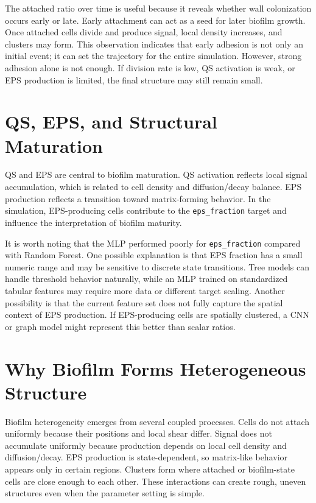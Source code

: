 \documentclass[12pt,a4paper,oneside]{report}
\begin{document}
The attached ratio over time is useful because it reveals whether wall colonization occurs early or late. Early attachment can act as a seed for later biofilm growth. Once attached cells divide and produce signal, local density increases, and clusters may form. This observation indicates that early adhesion is not only an initial event; it can set the trajectory for the entire simulation. However, strong adhesion alone is not enough. If division rate is low, QS activation is weak, or EPS production is limited, the final structure may still remain small.

\section{QS, EPS, and Structural Maturation}
QS and EPS are central to biofilm maturation. QS activation reflects local signal accumulation, which is related to cell density and diffusion/decay balance. EPS production reflects a transition toward matrix-forming behavior. In the simulation, EPS-producing cells contribute to the \texttt{eps\_fraction} target and influence the interpretation of biofilm maturity.

It is worth noting that the MLP performed poorly for \texttt{eps\_fraction} compared with Random Forest. One possible explanation is that EPS fraction has a small numeric range and may be sensitive to discrete state transitions. Tree models can handle threshold behavior naturally, while an MLP trained on standardized tabular features may require more data or different target scaling. Another possibility is that the current feature set does not fully capture the spatial context of EPS production. If EPS-producing cells are spatially clustered, a CNN or graph model might represent this better than scalar ratios.

\section{Why Biofilm Forms Heterogeneous Structure}
Biofilm heterogeneity emerges from several coupled processes. Cells do not attach uniformly because their positions and local shear differ. Signal does not accumulate uniformly because production depends on local cell density and diffusion/decay. EPS production is state-dependent, so matrix-like behavior appears only in certain regions. Clusters form where attached or biofilm-state cells are close enough to each other. These interactions can create rough, uneven structures even when the parameter setting is simple.
\end{document}
